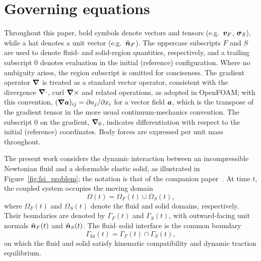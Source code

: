 \section{Governing equations}\label{sec:math_model}

Throughout this paper, bold symbols denote vectors and tensors (e.g.\ $\boldsymbol{v}_F$, $\boldsymbol{\sigma}_S$), while a hat denotes a unit vector (e.g.\ $\hat{\boldsymbol{n}}_F$).
The uppercase subscripts $F$ and $S$ are used to denote fluid- and solid-region quantities, respectively, and a trailing subscript $0$ denotes evaluation in the initial (reference) configuration.
Where no ambiguity arises, the region subscript is omitted for conciseness.
The gradient operator $\boldsymbol{\nabla}$ is treated as a standard vector operator, consistent with the divergence $\boldsymbol{\nabla} \cdot$, curl $\boldsymbol{\nabla} \times$ and related operations, as adopted in OpenFOAM; with this convention, $(\boldsymbol{\nabla} \boldsymbol{a})_{ij} = \partial a_j / \partial x_i$ for a vector field $\boldsymbol{a}$, which is the transpose of the gradient tensor in the more usual continuum-mechanics convention.
The subscript $0$ on the gradient, $\boldsymbol{\nabla}_0$, indicates differentiation with respect to the initial (reference) coordinates.
Body forces are expressed per unit mass throughout.

The present work considers the dynamic interaction between an incompressible Newtonian fluid and a deformable elastic solid, as illustrated in Figure~\ref{fig:fsi_problem}; the notation is that of the companion paper~\citep{CardiffFSIVerification2026}.
At time $t$, the coupled system occupies the moving domain
\begin{equation}
    \Omega(t) = \Omega_F(t) \cup \Omega_S(t),
\end{equation}
where $\Omega_F(t)$ and $\Omega_S(t)$ denote the fluid and solid domains, respectively.
Their boundaries are denoted by $\Gamma_F(t)$ and $\Gamma_S(t)$, with outward-facing unit normals $\hat{\boldsymbol{n}}_F(t)$ and $\hat{\boldsymbol{n}}_S(t)$.
The fluid--solid interface is the common boundary
\begin{equation}
    \Gamma_\text{fsi}(t)
    =
    \Gamma_F(t) \cap \Gamma_S(t),
\end{equation}
on which the fluid and solid satisfy kinematic compatibility and dynamic traction equilibrium.

